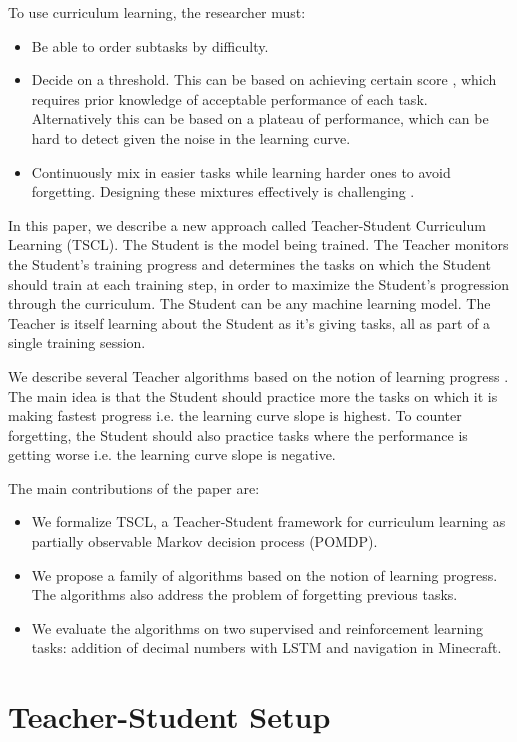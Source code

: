 \documentclass{article}
\begin{document}
To use curriculum learning, the researcher must:
\begin{itemize}
\item Be able to order subtasks by difficulty.
\item Decide on a  threshold. This can be based on achieving certain score \citep{Zaremba2014,wu2017training}, which requires prior knowledge of acceptable performance of each task. Alternatively this can be based on a plateau of performance, which can be hard to detect given the noise in the learning curve.
\item Continuously mix in easier tasks while learning harder ones to avoid forgetting. Designing these mixtures effectively is challenging
\citep{Zaremba2014}.
\end{itemize} 

In this paper, we describe a new approach called Teacher-Student Curriculum Learning (TSCL). The Student is the model being trained. The Teacher monitors the Student's training progress and determines the tasks on which the Student should train at each training step, in order to maximize the Student's progression through the curriculum. The Student can be any machine learning model. The Teacher is itself learning about the Student as it's giving tasks, all as part of a single training session.

We describe several Teacher algorithms based on the notion of learning progress \citep{Oudeyer2007}. The main idea is that the Student should practice more the tasks on which it is making fastest progress i.e. the learning curve slope is highest. To counter forgetting, the Student should also practice tasks where the performance is getting worse
i.e. the learning curve slope is negative.

The main contributions of the paper are:
\begin{itemize}
    \item We formalize TSCL, a Teacher-Student framework for curriculum learning as partially observable Markov decision process (POMDP).
    \item We propose a family of algorithms based on the notion of learning progress. The algorithms also address the problem of forgetting previous tasks.
    \item We evaluate the algorithms on two supervised and reinforcement learning tasks: addition of decimal numbers with LSTM and navigation in Minecraft.
\end{itemize}

\section{Teacher-Student Setup}
\label{teacher-student-setup}
\end{document}

